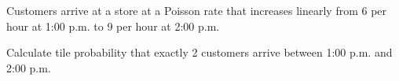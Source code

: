 Customers arrive at a store at a Poisson rate that increases linearly from 6 per hour at 1:00 p.m. to 9 per hour at 2:00 p.m. 


Calculate tile probability that exactly 2 customers arrive between 1:00 p.m. and 2:00 p.m. 



